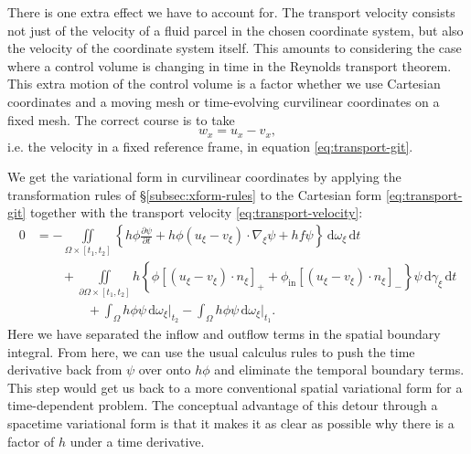 \documentclass[gmd, manuscript]{copernicus}
\begin{document}
There is one extra effect we have to account for.
The transport velocity consists not just of the velocity of a fluid parcel in the chosen coordinate system, but also the velocity of the coordinate system itself.
This amounts to considering the case where a control volume is changing in time in the Reynolds transport theorem.
This extra motion of the control volume is a factor whether we use Cartesian coordinates and a moving mesh or time-evolving curvilinear coordinates on a fixed mesh.
The correct course is to take
\begin{equation}
    w_x = u_x - v_x,
    \label{eq:transport-velocity}
\end{equation}
i.e. the velocity in a fixed reference frame, in equation \eqref{eq:transport-git}.

We get the variational form in curvilinear coordinates by applying the transformation rules of \S\ref{subsec:xform-rules} to the Cartesian form \eqref{eq:transport-git} together with the transport velocity \eqref{eq:transport-velocity}:
\begin{subequations}
    \label{eq:transport-tfc}
    \begin{align}
        0 & = -\iint\limits_{\Omega\times[t_1,t_2]}\left\{h\phi\frac{\partial\psi}{\partial t} + h\phi(u_\xi - v_\xi)\cdot\nabla_\xi\psi + hf\psi\right\}\,\mathrm d\omega_\xi\,\mathrm{d} t \\
        & \qquad + \iint\limits_{\partial\Omega\times[t_1,t_2]}h\left\{\phi\left[(u_\xi - v_\xi)\cdot n_\xi\right]_+ + \phi_{\text{in}}\left[(u_\xi - v_\xi)\cdot n_\xi\right]_- \right\}\psi\,\mathrm{d}\gamma_\xi\,\mathrm{d} t \\
        & \qquad\qquad + \int_\Omega h\phi\psi\,\mathrm{d}\omega_\xi\Bigg|_{t_2} - \int_\Omega h\phi\psi\,\mathrm{d}\omega_\xi\Bigg|_{t_1}.
    \end{align}
\end{subequations}
Here we have separated the inflow and outflow terms in the spatial boundary integral.
From here, we can use the usual calculus rules to push the time derivative back from $\psi$ over onto $h\phi$ and eliminate the temporal boundary terms.
This step would get us back to a more conventional spatial variational form for a time-dependent problem.
The conceptual advantage of this detour through a spacetime variational form is that it makes it as clear as possible why there is a factor of $h$ under a time derivative.
\end{document}
